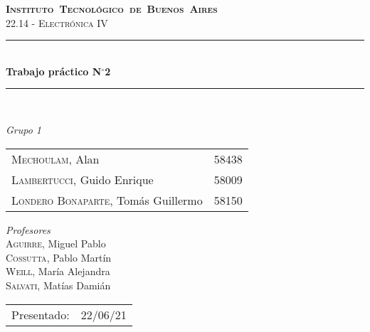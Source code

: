 \begin{titlepage}
\newcommand{\HRule}{\rule{\linewidth}{0.5mm}}
\center
\mbox{\textsc{\LARGE \bfseries {Instituto Tecnológico de Buenos Aires}}}\\[1.5cm]
\textsc{\Large 22.14 - Electrónica IV}\\[0.5cm]


\HRule \\[0.6cm]
{ \Huge \bfseries Trabajo práctico N$^{\circ}$2}\\[0.4cm] 
\HRule \\[1.5cm]


{\large

\emph{Grupo 1}\\
\vspace{3pt}

\begin{tabular}{lr} 	
\textsc{Mechoulam}, Alan  &  58438\\
\textsc{Lambertucci}, Guido Enrique  & 58009 \\
\textsc{Londero Bonaparte}, Tomás Guillermo  & 58150 \\
\end{tabular}

\vspace{20pt}

\emph{Profesores}\\
\textsc{Aguirre}, Miguel Pablo\\
\textsc{Cossutta}, Pablo Martín\\
\textsc{Weill}, María Alejandra\\
\textsc{Salvati}, Matías Damián\\



\vspace{3pt}

\vspace{100pt}

\begin{tabular}{ll}

Presentado: & 22/06/21\\

\end{tabular}

}

\vfill

\end{titlepage}
